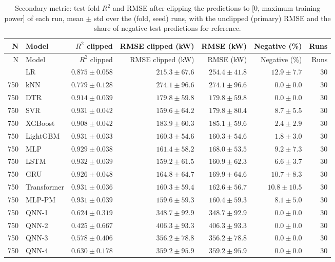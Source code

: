 \begin{longtable}{rlrrrrr}
\caption{Secondary metric: test-fold $R^2$ and RMSE after clipping the predictions to [0, maximum training power] of each run, mean $\pm$ std over the (fold, seed) runs, with the unclipped (primary) RMSE and the share of negative test predictions for reference.}\label{tab:t3c} \\
\toprule
N & Model & $R^2$ clipped & RMSE clipped (kW) & RMSE (kW) & Negative (\%) & Runs \\
\midrule
\endfirsthead
\toprule
N & Model & $R^2$ clipped & RMSE clipped (kW) & RMSE (kW) & Negative (\%) & Runs \\
\midrule
\endhead
\bottomrule
\endlastfoot
750 & LR & $0.875 \pm 0.058$ & $215.3 \pm 67.6$ & $254.4 \pm 41.8$ & $12.9 \pm 7.7$ & 30 \\
750 & kNN & $0.779 \pm 0.128$ & $274.1 \pm 96.6$ & $274.1 \pm 96.6$ & $0.0 \pm 0.0$ & 30 \\
750 & DTR & $0.914 \pm 0.039$ & $179.8 \pm 59.8$ & $179.8 \pm 59.8$ & $0.0 \pm 0.0$ & 30 \\
750 & SVR & $0.931 \pm 0.042$ & $159.6 \pm 64.2$ & $179.8 \pm 80.4$ & $8.7 \pm 5.5$ & 30 \\
750 & XGBoost & $0.908 \pm 0.042$ & $183.9 \pm 60.3$ & $185.1 \pm 59.6$ & $2.4 \pm 2.9$ & 30 \\
750 & LightGBM & $0.931 \pm 0.033$ & $160.3 \pm 54.6$ & $160.3 \pm 54.6$ & $1.8 \pm 3.0$ & 30 \\
750 & MLP & $0.929 \pm 0.038$ & $161.4 \pm 58.2$ & $168.0 \pm 53.5$ & $9.2 \pm 7.3$ & 30 \\
750 & LSTM & $0.932 \pm 0.039$ & $159.2 \pm 61.5$ & $160.9 \pm 62.3$ & $6.6 \pm 3.7$ & 30 \\
750 & GRU & $0.926 \pm 0.048$ & $164.8 \pm 64.7$ & $169.9 \pm 64.6$ & $10.7 \pm 8.3$ & 30 \\
750 & Transformer & $0.931 \pm 0.036$ & $160.3 \pm 59.4$ & $162.6 \pm 56.7$ & $10.8 \pm 10.5$ & 30 \\
750 & MLP-PM & $0.931 \pm 0.039$ & $159.6 \pm 59.3$ & $160.4 \pm 59.3$ & $8.1 \pm 5.0$ & 30 \\
750 & QNN-1 & $0.624 \pm 0.319$ & $348.7 \pm 92.9$ & $348.7 \pm 92.9$ & $0.0 \pm 0.0$ & 30 \\
750 & QNN-2 & $0.425 \pm 0.667$ & $406.3 \pm 93.3$ & $406.3 \pm 93.3$ & $0.0 \pm 0.0$ & 30 \\
750 & QNN-3 & $0.578 \pm 0.406$ & $356.2 \pm 78.8$ & $356.2 \pm 78.8$ & $0.0 \pm 0.0$ & 30 \\
750 & QNN-4 & $0.630 \pm 0.178$ & $359.2 \pm 95.9$ & $359.2 \pm 95.9$ & $0.0 \pm 0.0$ & 30 \\

\end{longtable}
